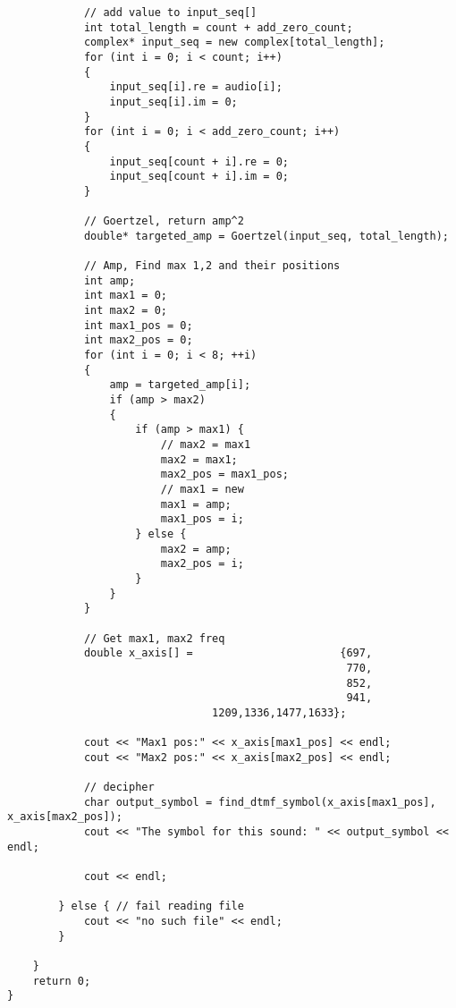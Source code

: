 \begin{lstlisting}
			// add value to input_seq[]
			int total_length = count + add_zero_count;
			complex* input_seq = new complex[total_length];
			for (int i = 0; i < count; i++)
			{
				input_seq[i].re = audio[i];
				input_seq[i].im = 0;
			}
			for (int i = 0; i < add_zero_count; i++)
			{
				input_seq[count + i].re = 0;
				input_seq[count + i].im = 0;
			}

			// Goertzel, return amp^2
			double* targeted_amp = Goertzel(input_seq, total_length);

			// Amp, Find max 1,2 and their positions
			int amp;
			int max1 = 0;
			int max2 = 0;
			int max1_pos = 0;
			int max2_pos = 0;
			for (int i = 0; i < 8; ++i)
			{
				amp = targeted_amp[i];
				if (amp > max2)
				{
					if (amp > max1) {
						// max2 = max1
						max2 = max1;
						max2_pos = max1_pos;
						// max1 = new
						max1 = amp;
						max1_pos = i;
					} else {
						max2 = amp;
						max2_pos = i;
					}
				}
			}

			// Get max1, max2 freq
			double x_axis[] = 				 		{697,
											  		 770,
											  		 852,
											  		 941,
								1209,1336,1477,1633};

			cout << "Max1 pos:" << x_axis[max1_pos] << endl;
			cout << "Max2 pos:" << x_axis[max2_pos] << endl;

			// decipher
			char output_symbol = find_dtmf_symbol(x_axis[max1_pos], x_axis[max2_pos]);
			cout << "The symbol for this sound: " << output_symbol << endl;

			cout << endl;

		} else { // fail reading file
			cout << "no such file" << endl;
		}

    }  
	return 0;
}
\end{lstlisting}

